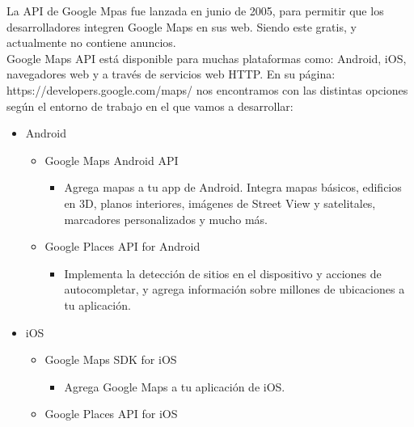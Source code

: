\documentclass[a4paper, 11pt]{article}
\begin{document}
\begin{itemize}
          La API de Google Mpas fue lanzada en junio de 2005, para permitir que
          los desarrolladores integren Google Maps en sus web. Siendo este gratis,
          y actualmente no contiene anuncios.\\


          Google Maps API está disponible para muchas plataformas como: Android,
          iOS, navegadores web y a través de servicios web HTTP. En su página:
          https://developers.google.com/maps/ nos encontramos con las distintas
          opciones según el entorno de trabajo en el que vamos a desarrollar:\\

          \begin{itemize}
            \item{Android}
              \begin{itemize}
                  \item{Google Maps Android API}
                    \begin{itemize}
                        \item{Agrega mapas a tu app de Android. Integra mapas
                              básicos, edificios en 3D, planos interiores,
                              imágenes de Street View y satelitales, marcadores
                              personalizados y mucho más.}
                    \end{itemize}
                  \item{Google Places API for Android}
                    \begin{itemize}
                        \item{Implementa la detección de sitios en el
                              dispositivo y acciones de autocompletar, y agrega
                              información sobre millones de ubicaciones a tu
                              aplicación.}
                    \end{itemize}
              \end{itemize}
            \item{iOS}
              \begin{itemize}
                  \item{Google Maps SDK for iOS}
                    \begin{itemize}
                        \item{Agrega Google Maps a tu aplicación de iOS.}
                    \end{itemize}
                  \item{Google Places API for iOS}

\end{itemize}
\end{itemize}
\end{itemize}
\end{document}
